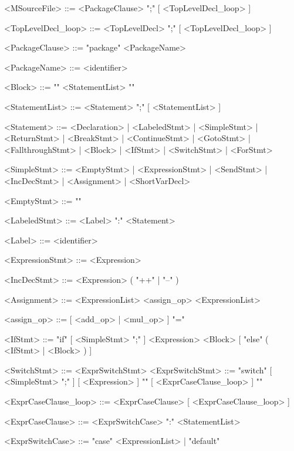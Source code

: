 
\begin{grammar}

    <MSourceFile>       ::=     <PackageClause> ";" [ <TopLevelDecl_loop> ]

    <TopLevelDecl_loop> ::=     <TopLevelDecl> ";" [ <TopLevelDecl_loop> ]

    <PackageClause>     ::=     "package" <PackageName>

    <PackageName>       ::=     <identifier>

    <Block>             ::=     "{" <StatementList> "}"

    <StatementList>     ::=     <Statement> ";" [ <StatementList> ]

    <Statement>             ::=     <Declaration> | <LabeledStmt> | <SimpleStmt>
                            |    <ReturnStmt> | <BreakStmt> | <ContinueStmt> 
                            |    <GotoStmt> | <FallthroughStmt> | <Block> | <IfStmt>
                            |    <SwitchStmt> | <ForStmt> 

    <SimpleStmt>            ::=     <EmptyStmt> | <ExpressionStmt> | <SendStmt>
                            |    <IncDecStmt> | <Assignment> | <ShortVarDecl>

    <EmptyStmt>             ::=     ""

    <LabeledStmt>           ::=     <Label> ":" <Statement>

    <Label>                 ::=     <identifier>

    <ExpressionStmt>        ::=     <Expression>

    <IncDecStmt>            ::=     <Expression> ( "++" | "--" )

    <Assignment>            ::=     <ExpressionList> <assign_op> <ExpressionList>

    <assign_op>             ::=     [ <add_op> | <mul_op> ] "="

    <IfStmt>                ::=     "if" [ <SimpleStmt> ";" ] <Expression> <Block> [ "else" ( <IfStmt> | <Block> ) ]

    <SwitchStmt>            ::=     <ExprSwitchStmt>
    <ExprSwitchStmt>        ::=     "switch" [ <SimpleStmt> ";" ] [ <Expression> ] "{" [ <ExprCaseClause_loop> ] "}"

    <ExprCaseClause_loop>   ::=     <ExprCaseClause> [ <ExprCaseClause_loop> ]

    <ExprCaseClause>        ::=     <ExprSwitchCase> ":" <StatementList>

    <ExprSwitchCase>        ::=     "case" <ExpressionList> | "default"


\end{grammar}
